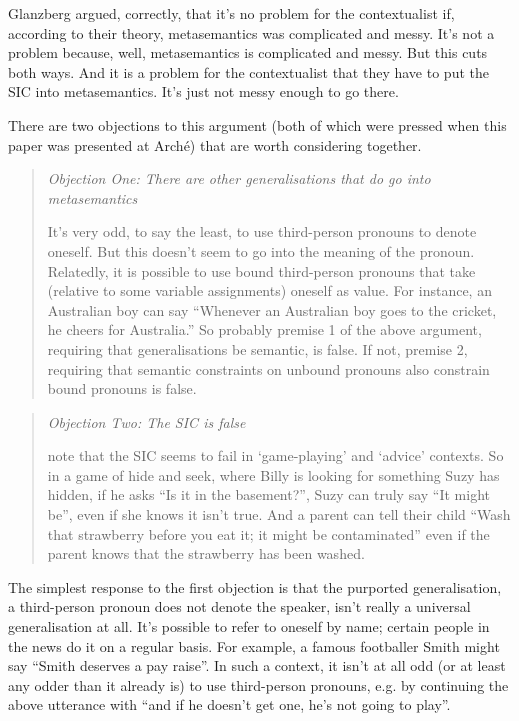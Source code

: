 \noindent Glanzberg argued, correctly, that it's no problem for the contextualist if, according to their theory, metasemantics was complicated and messy. It's not a problem because, well, metasemantics is complicated and messy. But this cuts both ways. And it is a problem for the contextualist that they have to put the SIC into metasemantics. It's just not messy enough to go there.

There are two objections to this argument (both of which were pressed when this paper was presented at Arch\'{e}) that are worth considering together.


\begin{quote}
{\itshape
Objection One: There are other generalisations that do go into metasemantics}

\noindent It's very odd, to say the least, to use third-person pronouns to denote oneself. But this doesn't seem to go into the meaning of the pronoun. Relatedly, it is possible to use bound third-person pronouns that take (relative to some variable assignments) oneself as value. For instance, an Australian boy can say ``Whenever an Australian boy goes to the cricket, he cheers for Australia.'' So probably premise 1 of the above argument, requiring that generalisations be semantic, is false. If not, premise 2, requiring that semantic constraints on unbound pronouns also constrain bound pronouns is false.
\end{quote}

\begin{quote}
{\itshape
Objection Two: The SIC is false}

\noindent \citet{Egan2005-EGAEMI} note that the SIC seems to fail in `game-playing' and `advice' contexts. So in a game of hide and seek, where Billy is looking for something Suzy has hidden, if he asks ``Is it in the basement?'', Suzy can truly say ``It might be'', even if she knows it isn't true. And a parent can tell their child ``Wash that strawberry before you eat it; it might be contaminated'' even if the parent knows that the strawberry has been washed.  
\end{quote}

\noindent The simplest response to the first objection is that the purported generalisation, a third-person pronoun does not denote the speaker, isn't really a universal generalisation at all. It's possible to refer to oneself by name; certain people in the news do it on a regular basis. For example, a famous footballer Smith might say ``Smith deserves a pay raise''. In such a context, it isn't at all odd (or at least any odder than it already is) to use third-person pronouns, e.g. by continuing the above utterance with ``and if he doesn't get one, he's not going to play''.

